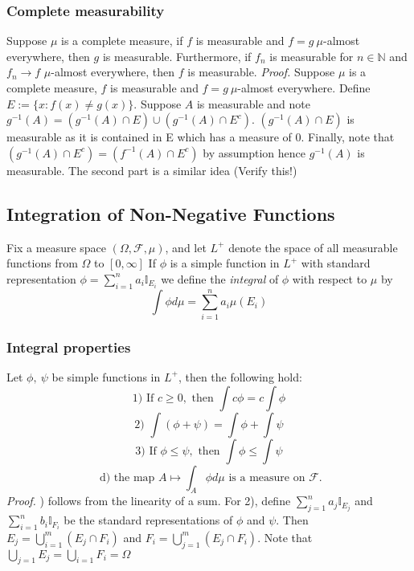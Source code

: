 \documentclass{article}
\begin{document}
\subsubsection{Complete measurability}
Suppose $\mu$ is a complete measure, if $f$ is measurable and $f=g  \ \mu$-almost everywhere, then $g$ is measurable. Furthermore, if $f_n$ is measurable for $n \in \mathbb{N}$ and $f_n\to f$ $\mu$-almost everywhere, then $f$ is measurable. \newline \newline
\textit{Proof.}\newline \newline
Suppose  $\mu$ is a complete measure, $f$ is measurable and $f=g  \ \mu$-almost everywhere. Define $E:=\{x:f(x)\neq g(x)\}$. Suppose $A$ is measurable and note $g^{-1}(A) = (g^{-1}(A)\cap E) \cup (g^{-1}(A)\cap E^c)$. $(g^{-1}(A)\cap E)$ is measurable as it is contained in E which has a measure of 0. Finally, note that $(g^{-1}(A)\cap E^c)=(f^{-1}(A)\cap E^c)$ by assumption hence $g^{-1}(A)$ is measurable. \newline \newline
The second part is a similar idea (Verify this!)
\subsection{Integration of Non-Negative Functions}
Fix a measure space $(\Omega, \mathcal{F}, \mu)$, and let $L^+$ denote the space of all measurable functions from $\Omega$ to  $[0,\infty]$ If $\phi$ is a simple function in $L^+$ with standard representation $\phi = \sum_{i=1}^na_i\mathbb{I}_{E_i}$ we define the \emph{integral} of $\phi$ with respect to $\mu$ by 
\[
\int\phi d\mu= \sum_{i=1}^na_i\mu(E_i)
\]
\subsubsection{Integral properties}
Let $\phi, \ \psi$ be simple functions in $L^+$, then the following hold:
\[
\text{1) If } c\geq 0, \text{ then } \int c\phi = c\int \phi
\]
\[
\text{2) }\int (\phi+ \psi) = \int \phi+ \int\psi
\]
\[
\text{3) If } \phi \leq \psi, \text{ then } \int \phi \leq \int \psi
\]
\[
\text{ d) the map } A\mapsto\int_A\phi d\mu \text{ is a measure on } \mathcal{F}.
\]
\textit{Proof.} \newline {}) follows from the linearity of a sum. For 2), define $\sum_{j=1}^na_j\mathbb{I}_{E_j}$ and $\sum_{i=1}^nb_i\mathbb{I}_{F_i}$ be the standard representations of $\phi$ and $\psi$. Then $E_j = \bigcup_{i=1}^m(E_j\cap F_i)$ and $F_i = \bigcup_{j=1}^m(E_j\cap F_i)$. Note that $\bigcup_{j=1}E_j=\bigcup_{i=1}F_i=\Omega$
\end{document}
